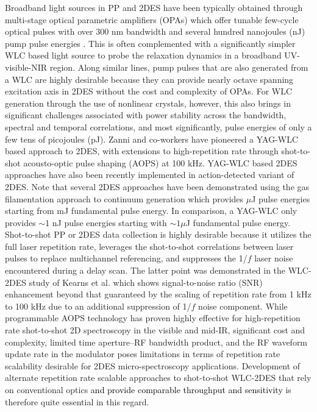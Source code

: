 \documentclass[%
aip,
amsmath,amssymb,
preprint,%
]{revtex4-2}
\newcommand*{\vt}[1]{\textcolor{black}{ #1}}
\begin{document}
Broadband light sources in PP and 2DES have been typically\cite{OgilvieARPC} obtained through multi-stage optical parametric amplifiers (OPAs) which offer tunable\cite{Cerullo2008} few-cycle optical pulses with over 300 nm bandwidth and several hundred nanojoules (nJ) pump pulse energies \cite{Kobayashi2002,Riedle2010}. This is often complemented with a significantly simpler WLC based light source\cite{Tekavec2009,Song2019} to probe the relaxation dynamics in a broadband UV-visible-NIR region. Along similar lines, pump pulses that are also generated from a WLC are highly desirable because they can provide nearly octave spanning excitation axis\cite{Mehlenbacher2015} in 2DES without the cost and complexity of OPAs. For WLC generation through the use of nonlinear crystals\cite{Bradler2009a}, however, this also brings in significant challenges associated with power stability\cite{Bradler2009a} across the bandwidth, spectral and temporal correlations\cite{Bradler2014}, and most significantly, pulse energies of only a few tens of picojoules (pJ). Zanni and co-workers have pioneered\cite{Mehlenbacher2015,Son2022} a YAG-WLC based approach to 2DES, with extensions to high-repetition rate through shot-to-shot acousto-optic pulse shaping\cite{Kearns2017} (AOPS) at 100 kHz. YAG-WLC based 2DES approaches have also been recently implemented in action-detected variant of 2DES\cite{Kunsel2019,Ogilvie2021,Sahu2023}. Note that several 2DES approaches have been demonstrated\cite{Engel2014, Harel2015, Cohen2017} using the gas filamentation approach to continuum generation which provides $\mu$J pulse energies starting from mJ fundamental pulse energy. In comparison, a YAG-WLC only provides $\sim$1 nJ pulse energies starting with $\sim 1 \mu$J fundamental pulse energy\cite{Bradler2009a}.  \\

Shot-to-shot PP\cite{Brixner2014,Bhat2023} or 2DES\cite{Kearns2017} data collection is highly desirable because it utilizes the full laser repetition rate, leverages the shot-to-shot correlations between laser pulses to replace multichannel referencing\cite{Lang2018}, and suppresses the 1/$f$ laser noise encountered during a delay scan\cite{Moon1993}. The latter point was demonstrated in the WLC-2DES study of Kearns et al.\cite{Kearns2017} which shows signal-to-noise ratio (SNR) enhancement beyond that guaranteed by the scaling of repetition rate from 1 kHz to 100 kHz due to an additional suppression of 1/$f$ noise component. While programmable AOPS technology\cite{Tull1997,Weiner2011} has proven highly effective for high-repetition rate shot-to-shot 2D spectroscopy in the visible\cite{Kearns2017} and mid-IR\cite{Krummel2016}, significant cost and complexity, limited time aperture--RF bandwidth product, and the RF waveform update rate\cite{Tull1997} in the modulator poses limitations in terms of repetition rate scalability desirable for 2DES micro-spectroscopy\cite{Jones2020,Martin2020,Goetz2018,Tiwari2018a} applications. Development of alternate repetition rate scalable approaches to shot-to-shot WLC-2DES that rely on conventional optics \vt{and provide comparable throughput and sensitivity} is therefore quite essential in this regard.  \\
\end{document}
